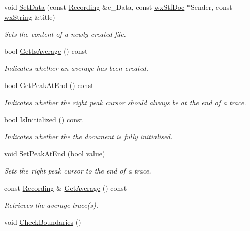 \begin{DoxyCompactItemize}
void \hyperlink{classwxStfDoc_a6e9f245187dc5656b655b205aaa35b56}{SetData} (const \hyperlink{classRecording}{Recording} \&c\_\-Data, const \hyperlink{classwxStfDoc}{wxStfDoc} $\ast$Sender, const \hyperlink{classwxString}{wxString} \&title)
\begin{DoxyCompactList}\small\item\em Sets the content of a newly created file. \item\end{DoxyCompactList}\item 
bool \hyperlink{classwxStfDoc_a4e71318907a99c8a05aa9fd05e660aa8}{GetIsAverage} () const 
\begin{DoxyCompactList}\small\item\em Indicates whether an average has been created. \item\end{DoxyCompactList}\item 
bool \hyperlink{classwxStfDoc_a9a1a53d398d157a6fbc3c76a1046f915}{GetPeakAtEnd} () const 
\begin{DoxyCompactList}\small\item\em Indicates whether the right peak cursor should always be at the end of a trace. \item\end{DoxyCompactList}\item 
bool \hyperlink{classwxStfDoc_a75a4270ebe16b66e2a171260b94f6ba3}{IsInitialized} () const 
\begin{DoxyCompactList}\small\item\em Indicates whether the the document is fully initialised. \item\end{DoxyCompactList}\item 
void \hyperlink{classwxStfDoc_acebb27e8f79da6253877bb7e0058273e}{SetPeakAtEnd} (bool value)
\begin{DoxyCompactList}\small\item\em Sets the right peak cursor to the end of a trace. \item\end{DoxyCompactList}\item 
const \hyperlink{classRecording}{Recording} \& \hyperlink{classwxStfDoc_aba369f7488cd4b4552e4a237d84d9f1c}{GetAverage} () const 
\begin{DoxyCompactList}\small\item\em Retrieves the average trace(s). \item\end{DoxyCompactList}\item 
\hypertarget{classwxStfDoc_a03dc14c52d0e354f1b2366d7869caf54}{
void \hyperlink{classwxStfDoc_a03dc14c52d0e354f1b2366d7869caf54}{CheckBoundaries} ()}
\label{classwxStfDoc_a03dc14c52d0e354f1b2366d7869caf54}


\end{DoxyCompactItemize}

